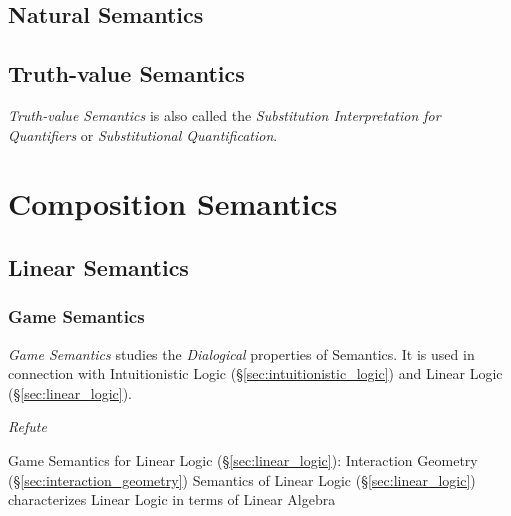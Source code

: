 \subsection{Natural Semantics}\label{sec:natural_semantics}



\subsection{Truth-value Semantics}\label{sec:truthvalue_semantics}

\emph{Truth-value Semantics} is also called the \emph{Substitution
  Interpretation for Quantifiers} or \emph{Substitutional
  Quantification}.



\section{Composition Semantics}\label{sec:composition_semantics}

\subsection{Linear Semantics}\label{sec:linear_semantics}

\subsubsection{Game Semantics}\label{sec:game_semantics}

\emph{Game Semantics} studies the \emph{Dialogical} properties of
Semantics. It is used in connection with Intuitionistic Logic
(\S\ref{sec:intuitionistic_logic}) and Linear Logic
(\S\ref{sec:linear_logic}).

\emph{Refute}


Game Semantics for Linear Logic (\S\ref{sec:linear_logic}):
Interaction Geometry (\S\ref{sec:interaction_geometry}) Semantics of
Linear Logic (\S\ref{sec:linear_logic}) characterizes Linear Logic in
terms of Linear Algebra

